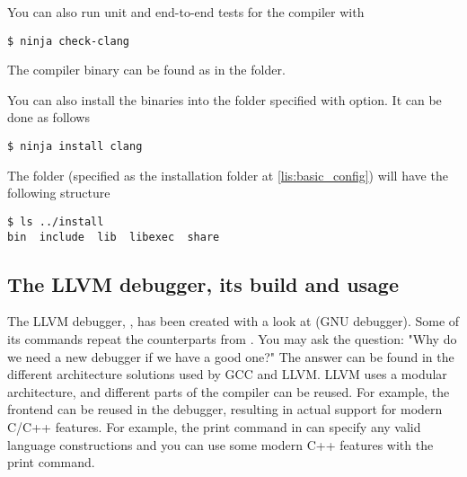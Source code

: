 You can also run unit and end-to-end tests for the compiler with
\begin{adjustwidth}{0em}{0em}
\begin{verbatim}
$ ninja check-clang
\end{verbatim}
\end{adjustwidth}
The compiler binary can be found as  in the 
folder.  



You can also install the binaries into the folder specified with
 option. It can be done as follows
\begin{adjustwidth}{0em}{0em}
\begin{verbatim}
$ ninja install clang
\end{verbatim}
\end{adjustwidth}
The folder  (specified as the installation folder at
\cref{lis:basic_config}) 
will have the following structure
\begin{adjustwidth}{0em}{0em}
\begin{verbatim}
$ ls ../install
bin  include  lib  libexec  share
\end{verbatim}
\end{adjustwidth}

\subsection{The LLVM debugger, its build and usage}
The LLVM debugger, \lldb, has been created with a look at
\gdb (GNU debugger). Some of its commands repeat the counterparts from
\gdb. You may ask the question: "Why do we need a new debugger if we
have a good one?" The answer can be found in the different architecture
solutions used by GCC and LLVM. LLVM uses a modular architecture, and different
parts of the compiler can be reused. For example, the \clang frontend can be
reused in the debugger, resulting in actual support for modern C/C++
features. For example, the print command in  can specify any valid
language constructions and you can use some modern C++ features with the
 print command. 

